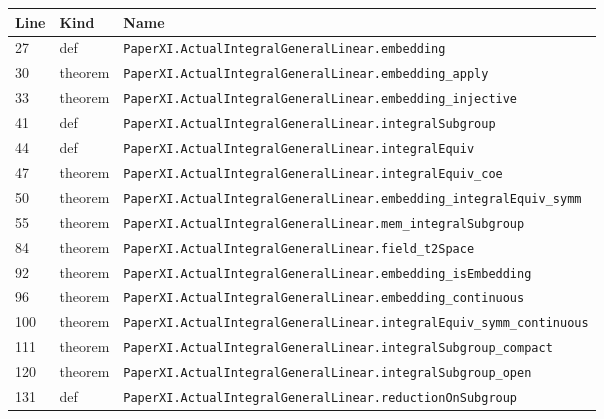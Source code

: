 \documentclass[10pt,oneside]{book}
\begin{document}
\begin{longtable}{@{}p{}p{}p{}@{}}\toprule Line&Kind&Name\\\midrule\endhead

27&def&\nolinkurl{PaperXI.ActualIntegralGeneralLinear.embedding}\\

30&theorem&\nolinkurl{PaperXI.ActualIntegralGeneralLinear.embedding_apply}\\

33&theorem&\nolinkurl{PaperXI.ActualIntegralGeneralLinear.embedding_injective}\\

41&def&\nolinkurl{PaperXI.ActualIntegralGeneralLinear.integralSubgroup}\\

44&def&\nolinkurl{PaperXI.ActualIntegralGeneralLinear.integralEquiv}\\

47&theorem&\nolinkurl{PaperXI.ActualIntegralGeneralLinear.integralEquiv_coe}\\

50&theorem&\nolinkurl{PaperXI.ActualIntegralGeneralLinear.embedding_integralEquiv_symm}\\

55&theorem&\nolinkurl{PaperXI.ActualIntegralGeneralLinear.mem_integralSubgroup}\\

84&theorem&\nolinkurl{PaperXI.ActualIntegralGeneralLinear.field_t2Space}\\

92&theorem&\nolinkurl{PaperXI.ActualIntegralGeneralLinear.embedding_isEmbedding}\\

96&theorem&\nolinkurl{PaperXI.ActualIntegralGeneralLinear.embedding_continuous}\\

100&theorem&\nolinkurl{PaperXI.ActualIntegralGeneralLinear.integralEquiv_symm_continuous}\\

111&theorem&\nolinkurl{PaperXI.ActualIntegralGeneralLinear.integralSubgroup_compact}\\

120&theorem&\nolinkurl{PaperXI.ActualIntegralGeneralLinear.integralSubgroup_open}\\

131&def&\nolinkurl{PaperXI.ActualIntegralGeneralLinear.reductionOnSubgroup}\\


\end{longtable}
\end{document}
